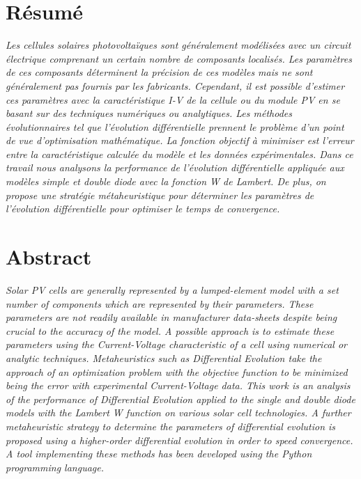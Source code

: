 \vspace*{\fill}
\section*{Résumé}
\textit{Les cellules solaires photovoltaïques sont généralement modélisées avec un circuit électrique comprenant un certain nombre de composants localisés. Les paramètres de ces composants déterminent la précision de ces modèles mais ne sont généralement pas fournis par les fabricants. Cependant, il est possible d'estimer ces paramètres avec la caractéristique I-V de la cellule ou du module PV en se basant sur des techniques numériques ou analytiques. Les méthodes évolutionnaires tel que l'évolution différentielle prennent le problème d'un point de vue d'optimisation mathématique. La fonction objectif à minimiser est l'erreur entre la caractéristique calculée du modèle et les données expérimentales. Dans ce travail nous analysons la performance de l'évolution différentielle appliquée aux modèles simple et double diode avec la fonction W de Lambert. De plus, on propose une stratégie métaheuristique pour déterminer les paramètres de l'évolution différentielle pour optimiser le temps de convergence.
}
\vspace*{\fill}
\section*{Abstract}
\textit{Solar PV cells are generally represented by a lumped-element model with a set number of components which are represented by their parameters. These parameters are not readily available in manufacturer data-sheets despite being crucial to the accuracy of the model. A possible approach is to estimate these parameters using the Current-Voltage characteristic of a cell using numerical or analytic techniques. Metaheuristics such as Differential Evolution take the approach of an optimization problem with the objective function to be minimized being the error with experimental Current-Voltage data. This work is an analysis of the performance of Differential Evolution applied to the single and double diode models with the Lambert W function on various solar cell technologies. A further metaheuristic strategy to determine the parameters of differential evolution is proposed using a higher-order differential evolution in order to speed convergence. A tool implementing these methods has been developed using the Python programming language.}
\vspace*{\fill}

